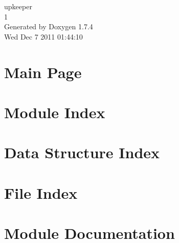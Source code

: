 \documentclass[a4paper]{book}
\begin{document}
\begin{titlepage}
\vspace*{7cm}
\begin{center}
{\Large upkeeper \\[1ex]\large 1 }\\
\vspace*{1cm}
{\large Generated by Doxygen 1.7.4}\\
\vspace*{0.5cm}
{\small Wed Dec 7 2011 01:44:10}\\
\end{center}
\end{titlepage}
\clearemptydoublepage
{}
\tableofcontents
\clearemptydoublepage
{}
\chapter{Main Page}
\label{index}
\chapter{Module Index}

\chapter{Data Structure Index}

\chapter{File Index}

\chapter{Module Documentation}











\end{document}
